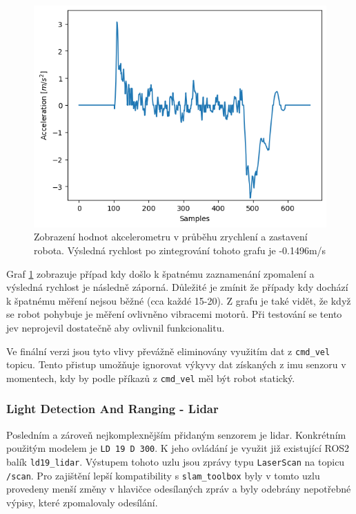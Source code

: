 \begin{figure}[h!]
	\centering
	\includegraphics[scale=0.75]{obrazky-figures/accelerometer_graph.png}
	\caption[Graf hodnot akcelerometru]{Zobrazení hodnot akcelerometru v průběhu zrychlení a zastavení robota. Výsledná rychlost po zintegrování tohoto grafu je -0.1496m/s}
	\label{fig:accel_readings}
\end{figure}
Graf \ref{fig:accel_readings} zobrazuje případ kdy došlo k špatnému zaznamenání zpomalení a výsledná rychlost je následně záporná. Důležité je zmínit že případy kdy dochází k špatnému měření nejsou běžné (cca každé 15-20). Z grafu je také vidět, že když se robot pohybuje je měření ovlivněno vibracemi motorů. Při testování se tento jev neprojevil dostatečně aby ovlivnil funkcionalitu.

Ve finální verzi jsou tyto vlivy převážně eliminovány využitím dat z \verb|cmd_vel| topicu. Tento přistup umožňuje ignorovat výkyvy dat získaných z imu senzoru v momentech, kdy by podle příkazů z \verb|cmd_vel| měl být robot statický.

\subsubsection*{Light Detection And Ranging - Lidar}
Posledním a zároveň nejkomplexnějším přidaným senzorem je lidar. Konkrétním použitým modelem je \verb|LD 19 D 300|. K jeho ovládání je využit již existující ROS2 balík \verb|ld19_lidar|. Výstupem tohoto uzlu jsou zprávy typu \verb|LaserScan| na topicu \verb|/scan|. Pro zajištění lepší kompatibility s \verb|slam_toolbox| byly v tomto uzlu provedeny menší změny v hlavičce odesílaných zpráv a byly odebrány nepotřebné výpisy, které zpomalovaly odesílání.

